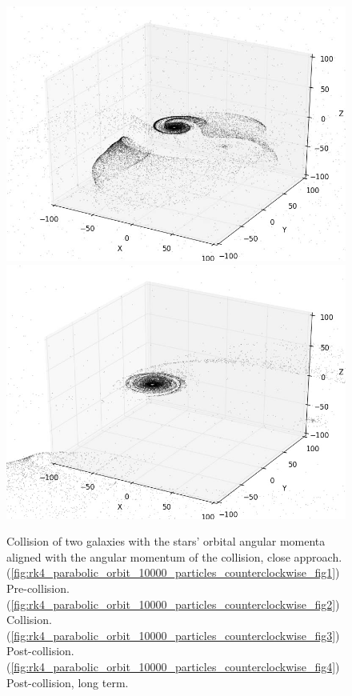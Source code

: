 \documentclass[10pt,letterpaper]{article}
\begin{document}
\begin{figure}[!htb]
  \includegraphics[width=\linewidth]{figures/galaxy_collisions/rk4_parabolic_orbit_10000_particles_counterclockwise_fig3.png}
  \subcaption{}\label{fig:rk4_parabolic_orbit_10000_particles_counterclockwise_fig3}
\endminipage
{}%
  \includegraphics[width=\linewidth]{figures/galaxy_collisions/rk4_parabolic_orbit_10000_particles_counterclockwise_fig4.png}
  \subcaption{}\label{fig:rk4_parabolic_orbit_10000_particles_counterclockwise_fig4}
\endminipage
\caption{Collision of two galaxies with the stars' orbital angular momenta aligned with the angular momentum of the collision, close approach. (\ref{fig:rk4_parabolic_orbit_10000_particles_counterclockwise_fig1}) Pre-collision. (\ref{fig:rk4_parabolic_orbit_10000_particles_counterclockwise_fig2}) Collision. (\ref{fig:rk4_parabolic_orbit_10000_particles_counterclockwise_fig3}) Post-collision. (\ref{fig:rk4_parabolic_orbit_10000_particles_counterclockwise_fig4})
Post-collision, long term.}\label{fig:rk4_parabolic_orbit_10000_particles_counterclockwise}
\end{figure}
\end{document}
